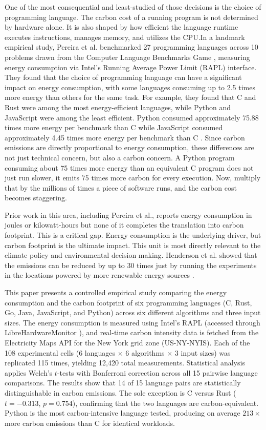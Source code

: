 One of the most consequential and least-studied of those decisions is the choice of programming language. The carbon cost of a running program is not determined by hardware alone. It is also shaped by how efficient the language runtime executes instructions, manages memory, and utilizes the CPU.In a landmark empirical study, Pereira et al. \cite{10.1145/3136014.3136031} benchmarked 27 programming languages across 10 problems drawn from the Computer Language Benchmarks Game \cite{clbg}, measuring energy consumption via Intel's Running Average Power Limit (RAPL) interface. They found that the choice of programming language can have a significant impact on energy consumption, with some languages consuming up to 2.5 times more energy than others for the same task. For example, they found that C and Rust were among the most energy-efficient languages, while Python and JavaScript were among the least efficient. Python consumed approximately 75.88 times more energy per benchmark than C while JavaScript consumed approximately 4.45 times more energy per benchmark than C \cite{10.1145/3136014.3136031}. Since carbon emissions are directly proportional to energy consumption, these differences are not just technical concern, but also a carbon concern. A Python program consuming about 75 times more energy than an equivalent C program does not just run slower, it emits 75 times more carbon for every execution. Now, multiply that by the millions of times a piece of software runs, and the carbon cost becomes staggering.

Prior work in this area, including Pereira et al., reports energy consumption in joules or kilowatt-hours but none of it completes the translation into carbon footprint. This is a critical gap. Energy consumption is the underlying driver, but carbon footprint is the ultimate impact. This unit is most directly relevant to the climate policy and environmental decision making.
Henderson et al. showed that the emissions can be reduced by up to 30 times just by running the experiments in the locations powered by more renewable energy sources \cite{10.5555/3455716.3455964}. 


This paper presents a controlled empirical study comparing the energy consumption and the carbon footprint of six programming languages (C, Rust, Go, Java, JavaScript, and Python) across six different algorithms and three input sizes. The energy consumption is measured using Intel's RAPL (accessed through LibreHardwareMonitor \cite{librehardwaremonitor}), and real-time carbon intensity data is fetched from the Electricity Maps API \cite{electricitymap} for the New York grid zone (US-NY-NYIS). Each of the 108 experimental cells (6 languages $\times$ 6 algorithms $\times$ 3 input sizes) was replicated 115 times, yielding 12,420 total measurements. Statistical analysis applies Welch's $t$-tests with Bonferroni correction across all 15 pairwise language comparisons. The results show that 14 of 15 language pairs are statistically distinguishable in carbon emissions. The sole exception is C versus Rust ($t = -0.313$, $p = 0.754$), confirming that the two languages are carbon-equivalent. Python is the most carbon-intensive language tested, producing on average $213\times$ more carbon emissions than C for identical workloads.